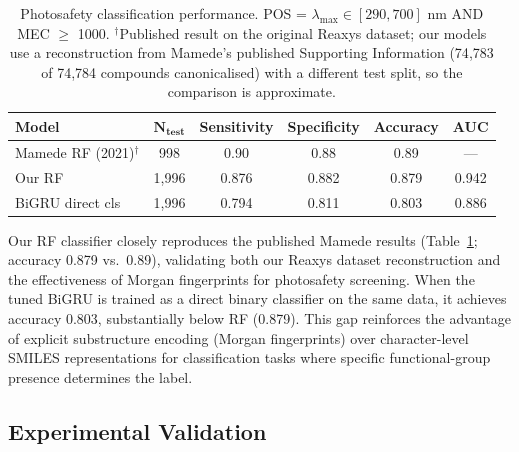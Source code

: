 \documentclass[journal=jcisd8,manuscript=article]{achemso}
\begin{document}
\begin{table}[htbp]
\centering
\caption{Photosafety classification performance. POS = $\lambda_{\max} \in [290,700]$ nm AND MEC $\geq$ 1000. $^\dagger$Published result on the original Reaxys dataset; our models use a reconstruction from Mamede's published Supporting Information (74{,}783 of 74{,}784 compounds canonicalised) with a different test split, so the comparison is approximate.}
\label{tab:classification}
\begin{tabular}{lccccc}
\toprule
\textbf{Model} & $\boldsymbol{N_{\text{test}}}$ & \textbf{Sensitivity} & \textbf{Specificity} & \textbf{Accuracy} & \textbf{AUC} \\
\midrule
Mamede RF (2021)$^\dagger$ & 998 & 0.90 & 0.88 & 0.89 & --- \\
Our RF & 1,996 & 0.876 & 0.882 & 0.879 & 0.942 \\
BiGRU direct cls & 1,996 & 0.794 & 0.811 & 0.803 & 0.886 \\
\bottomrule
\end{tabular}
\end{table}

Our RF classifier closely reproduces the published Mamede results (Table~\ref{tab:classification}; accuracy 0.879 vs.\ 0.89), validating both our Reaxys dataset reconstruction and the effectiveness of Morgan fingerprints for photosafety screening.
When the tuned BiGRU is trained as a direct binary classifier on the same data, it achieves accuracy 0.803, substantially below RF (0.879).
This gap reinforces the advantage of explicit substructure encoding (Morgan fingerprints) over character-level SMILES representations for classification tasks where specific functional-group presence determines the label.


\subsection{Experimental Validation}
\label{sec:experimental}
\end{document}
